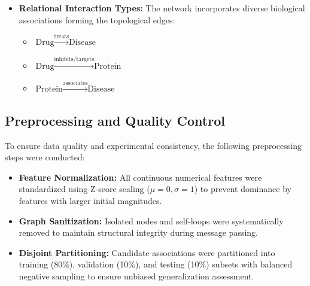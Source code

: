 \documentclass[preprint,12pt]{elsarticle}
\begin{document}
\begin{itemize}
\begin{equation}
    \end{equation}
    where $\mathbb{I}(v \in \mathcal{V}_{\text{drug}}) \in \{0, 1\}$ is a discrete entity-type indicator. For disease and protein nodes ($v \notin \mathcal{V}_{\text{drug}}$), the chemical projection is nullified ($\mathbf{W}_{\text{chem}}^{(1)} \mathbf{x}_v^{\text{chem}} = \mathbf{0}$), ensuring that non-drug vertices are mapped strictly within the calibrated 128-dimensional textual semantic ontology space (derived from MONDO, HPO, and UniProt definitions). Consequently, small-molecule physicochemical features remain strictly quarantined to compound representations and propagate to downstream biological targets exclusively via multi-hop topological message passing, eliminating modality distortion.
    
    \item \textbf{Relational Interaction Types:} 
    The network incorporates diverse biological associations forming the topological edges:
    \begin{itemize}
        \item $\text{Drug} \xrightarrow{\text{treats}} \text{Disease}$
        \item $\text{Drug} \xrightarrow{\text{inhibits/targets}} \text{Protein}$
        \item $\text{Protein} \xrightarrow{\text{associates}} \text{Disease}$
    \end{itemize}
\end{itemize}

\subsection{Preprocessing and Quality Control}
To ensure data quality and experimental consistency, the following preprocessing steps were conducted:
\begin{itemize}
    \item \textbf{Feature Normalization:} 
    All continuous numerical features were standardized using Z-score scaling ($\mu=0, \sigma=1$) to prevent dominance by features with larger initial magnitudes.
    \item \textbf{Graph Sanitization:} 
    Isolated nodes and self-loops were systematically removed to maintain structural integrity during message passing.
    \item \textbf{Disjoint Partitioning:} 
    Candidate associations were partitioned into training (80\%), validation (10\%), and testing (10\%) subsets with balanced negative sampling to ensure unbiased generalization assessment.
\end{itemize}
\end{document}
